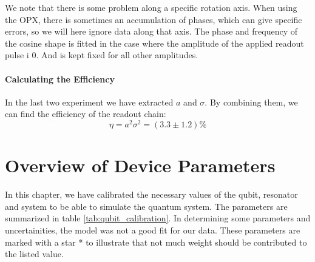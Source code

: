 We note that there is some problem along a specific rotation axis. When using the OPX, there is sometimes an accumulation of phases, which can give specific errors, so we will here ignore data along that axis. The phase and frequency of the cosine shape is fitted in the case where the amplitude of the applied readout pulse i 0. And is kept fixed for all other amplitudes.

\paragraph{Calculating the Efficiency}
In the last two experiment we have extracted $a$ and $\sigma$. By combining them, we can find the efficiency of the readout chain:
\begin{equation}
    \eta = a^2\sigma^2 = (3.3 \pm 1.2) \% 
\end{equation}








\FloatBarrier
\section{Overview of Device Parameters}\label{sec:overview_section}
In this chapter, we have calibrated the necessary values of the qubit, resonator and system to be able to simulate the quantum system. The parameters are summarized in table \ref{tab:qubit_calibration}. In determining some parameters and uncertainities, the model was not a good fit for our data. These parameters are marked with a star * to illustrate that not much weight should be contributed to the listed value.


